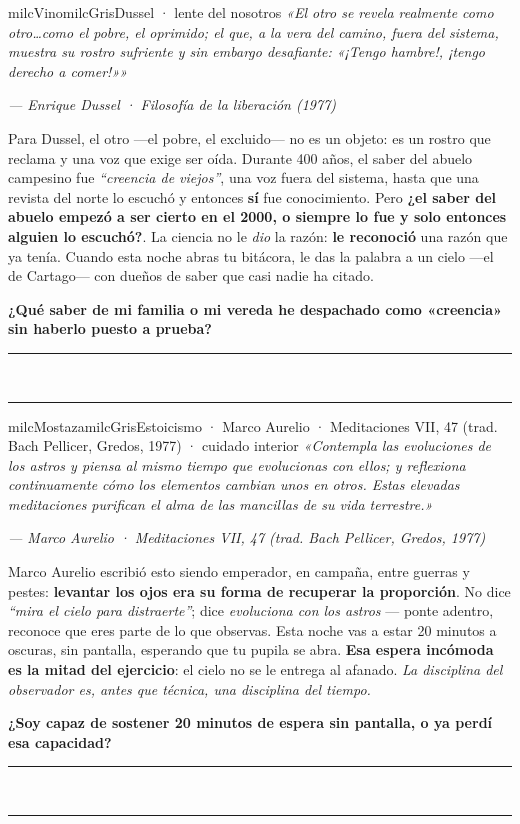 \documentclass[11pt,letterpaper]{article}
\newcommand{\linead}[1]{\noindent\color{milcLinea}\rule{#1}{0.5pt}\color{milcNegro}}
\begin{document}
\begin{softbox}{milcVino}{milcGris}{Dussel · lente del nosotros}
\textit{«El otro se revela realmente como otro\ldots como el pobre, el oprimido; el que, a la vera del camino, fuera del sistema, muestra su rostro sufriente y sin embargo desafiante: «¡Tengo hambre!, ¡tengo derecho a comer!»»}

{\footnotesize\itshape\color{milcNegro!70}--- Enrique Dussel · Filosofía de la liberación (1977)}

Para Dussel, el otro ---el pobre, el excluido--- no es un objeto: es un rostro que reclama y una voz que exige ser oída. Durante 400 años, el saber del abuelo campesino fue \emph{``creencia de viejos''}, una voz fuera del sistema, hasta que una revista del norte lo escuchó y entonces \textbf{sí} fue conocimiento. Pero \textbf{¿el saber del abuelo empezó a ser cierto en el 2000, o siempre lo fue y solo entonces alguien lo escuchó?}. La ciencia no le \emph{dio} la razón: \textbf{le reconoció} una razón que ya tenía. Cuando esta noche abras tu bitácora, le das la palabra a un cielo ---el de Cartago--- con dueños de saber que casi nadie ha citado.

\textbf{¿Qué saber de mi familia o mi vereda he despachado como «creencia» sin haberlo puesto a prueba?}
\end{softbox}
\linead{\linewidth}\\[1mm]
\linead{\linewidth}

\begin{softbox}{milcMostaza}{milcGris}{Estoicismo · Marco Aurelio · Meditaciones VII, 47 (trad. Bach Pellicer, Gredos, 1977) · cuidado interior}
\textit{«Contempla las evoluciones de los astros y piensa al mismo tiempo que evolucionas con ellos; y reflexiona continuamente cómo los elementos cambian unos en otros. Estas elevadas meditaciones purifican el alma de las mancillas de su vida terrestre.»}

{\footnotesize\itshape\color{milcNegro!70}--- Marco Aurelio · Meditaciones VII, 47 (trad. Bach Pellicer, Gredos, 1977)}

Marco Aurelio escribió esto siendo emperador, en campaña, entre guerras y pestes: \textbf{levantar los ojos era su forma de recuperar la proporción}. No dice \emph{``mira el cielo para distraerte''}; dice \emph{evoluciona con los astros} --- ponte adentro, reconoce que eres parte de lo que observas. Esta noche vas a estar 20 minutos a oscuras, sin pantalla, esperando que tu pupila se abra. \textbf{Esa espera incómoda es la mitad del ejercicio}: el cielo no se le entrega al afanado. \emph{La disciplina del observador es, antes que técnica, una disciplina del tiempo.}

\textbf{¿Soy capaz de sostener 20 minutos de espera sin pantalla, o ya perdí esa capacidad?}
\end{softbox}
\linead{\linewidth}\\[1mm]
\linead{\linewidth}
\end{document}
